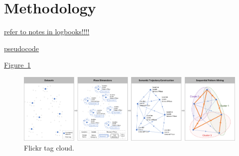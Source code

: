 \documentclass{article}
\begin{document}
\newpage


\section{Methodology}
\underline{refer to notes in logbooks!!!!}

\underline{pseudocode}

\underline{Figure~\ref{fig:flowchart}}
\begin{figure}
\centering
\includegraphics[width=1\textwidth]{figures/flowchart.png}
\caption{\label{fig:flowchart}Flickr tag cloud.}
\end{figure}
\end{document}
